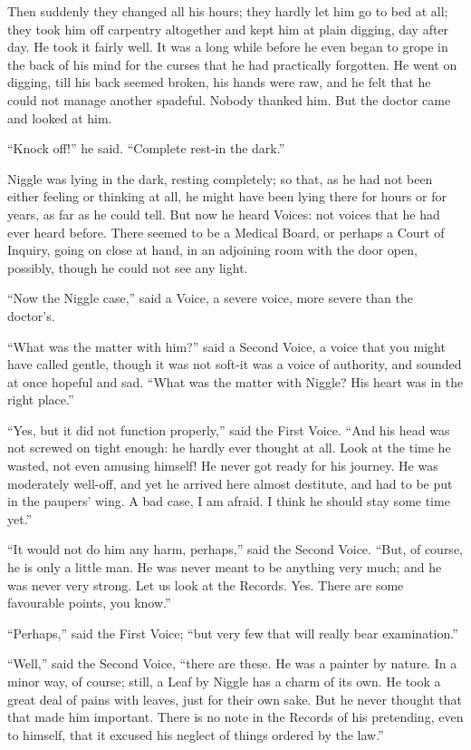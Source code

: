 \documentclass[english]{scrartcl}
\begin{document}
Then suddenly they changed all his hours; they hardly let him go to bed at all; they took him off carpentry altogether and kept him at plain digging, day after day. He took it fairly well. It was a long while before he even began to grope in the back of his mind for the curses that he had practically forgotten. He went on digging, till his back seemed broken, his hands were raw, and he felt that he could not manage another spadeful. Nobody thanked him. But the doctor came and looked at him.

“Knock off!” he said. “Complete rest-in the dark.”

Niggle was lying in the dark, resting completely; so that, as he had not been either feeling or thinking at all, he might have been lying there for hours or for years, as far as he could tell. But now he heard Voices: not voices that he had ever heard before. There seemed to be a Medical Board, or perhaps a Court of Inquiry, going on close at hand, in an adjoining room with the door open, possibly, though he could not see any light.

“Now the Niggle case,” said a Voice, a severe voice, more severe than the doctor’s.

“What was the matter with him?” said a Second Voice, a voice that you might have called gentle, though it was not soft-it was a voice of authority, and sounded at once hopeful and sad. “What was the matter with Niggle? His heart was in the right place.”

“Yes, but it did not function properly,” said the First Voice. “And his head was not screwed on tight enough: he hardly ever thought at all. Look at the time he wasted, not even amusing himself! He never got ready for his journey. He was moderately well-off, and yet he arrived here almost destitute, and had to be put in the paupers’ wing. A bad case, I am afraid. I think he should stay some time yet.”

“It would not do him any harm, perhaps,” said the Second Voice. “But, of course, he is only a little man. He was never meant to be anything very much; and he was never very strong. Let us look at the Records. Yes. There are some favourable points, you know.”

“Perhaps,” said the First Voice; “but very few that will really bear examination.”

“Well,” said the Second Voice, “there are these. He was a painter by nature. In a minor way, of course; still, a Leaf by Niggle has a charm of its own. He took a great deal of pains with leaves, just for their own sake. But he never thought that that made him important. There is no note in the Records of his pretending, even to himself, that it excused his neglect of things ordered by the law.”
\end{document}
